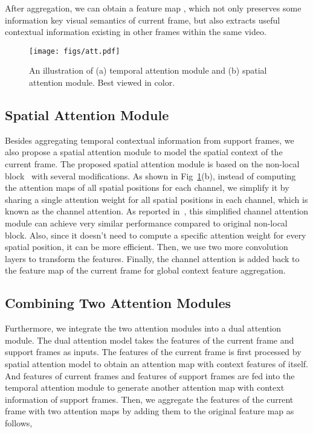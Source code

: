 \documentclass[letterpaper]{article} \usepackage{aaai21}  \usepackage{times}  \usepackage{helvet} \usepackage{courier}  \usepackage[hyphens]{url}  \usepackage{graphicx} \urlstyle{rm} \def\UrlFont{\rm}  \usepackage{natbib}  \usepackage{caption} \frenchspacing  \setlength{\pdfpagewidth}{8.5in}  \setlength{\pdfpageheight}{11in}  \newcommand{\etal}{\emph{et al. }}
\begin{document}
After aggregation, we can obtain a feature map , which not only preserves some information key visual semantics of current frame, but also extracts useful contextual information existing in other frames within the same video. 

\begin{figure}[t]
	\centering
	\texttt{[image: figs/att.pdf]}
\caption{An illustration of (a) temporal attention module and (b) spatial attention module. Best viewed in color.}
	\label{fig:att}
\end{figure}

\subsection{Spatial Attention Module}
Besides aggregating temporal contextual information from support frames, we also propose a spatial attention module to model the spatial context of the current frame. The proposed spatial attention module is based on the non-local block~\cite{wang2018non} with several 
modifications. As shown in Fig~\ref{fig:att}(b), instead of computing the attention maps of all spatial positions for each channel, we simplify it by sharing a single attention weight for all spatial positions in each channel, which is known as the channel attention. As reported in~\cite{cao2019gcnet}, this simplified channel attention module can achieve very similar performance compared to original non-local block. Also, since it doesn't need to compute a specific attention weight for every spatial position, it can be more efficient. Then, we use two more convolution layers to transform the features. Finally, the channel attention is added back to the feature map of the current frame for global context feature aggregation. 


\subsection{Combining Two Attention Modules}
Furthermore, we integrate the two attention modules into a dual attention module. The dual attention model takes the features of the current frame and support frames as inputs. The features of the current frame  is first processed by spatial attention model to obtain an attention map with context features of itself. And features of current frames  and features of support frames  are fed into the temporal attention module to generate another attention map with context information of support frames. Then, we aggregate the features of the current frame with two attention maps by adding them to the original feature map  as follows,  
\end{document}
